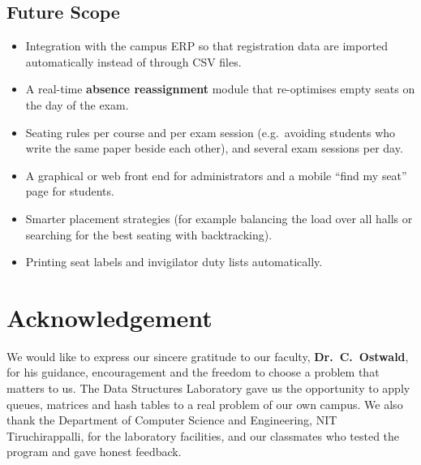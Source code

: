 \documentclass[12pt,a4paper]{report}
\newcommand{\facultyname}{Dr.~C.~Ostwald}   %
\begin{document}
\section{Future Scope}
\begin{itemize}
  \item Integration with the campus ERP so that registration data are imported automatically instead of through CSV files.
  \item A real-time \textbf{absence reassignment} module that re-optimises empty seats on the day of the exam.
  \item Seating rules per course and per exam session (e.g.\ avoiding students who write the same paper beside each other), and several exam sessions per day.
  \item A graphical or web front end for administrators and a mobile ``find my seat'' page for students.
  \item Smarter placement strategies (for example balancing the load over all halls or searching for the best seating with backtracking).
  \item Printing seat labels and invigilator duty lists automatically.
\end{itemize}

\chapter{Acknowledgement}
We would like to express our sincere gratitude to our faculty, \textbf{\facultyname}, for his guidance, encouragement and the freedom to choose a problem that matters to us. The Data Structures Laboratory gave us the opportunity to apply queues, matrices and hash tables to a real problem of our own campus. We also thank the Department of Computer Science and Engineering, NIT Tiruchirappalli, for the laboratory facilities, and our classmates who tested the program and gave honest feedback.
\end{document}
